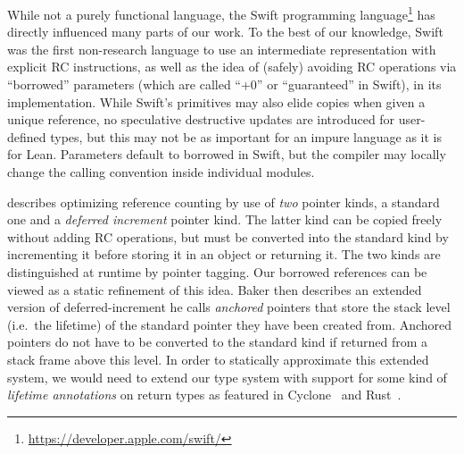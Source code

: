 While not a purely functional language, the Swift programming
language\footnote{\url{https://developer.apple.com/swift/}} has directly
influenced many parts of our work. To the best of our knowledge, Swift was the
first non-research language to use an intermediate representation with explicit RC
instructions, as well as the idea of (safely) avoiding RC operations via ``borrowed''
parameters (which are called ``+0'' or ``guaranteed'' in Swift), in its
implementation. While Swift's primitives may also elide copies when given a
unique reference, no speculative destructive updates are introduced for
user-defined types, but this may not be as important for an impure language as
it is for Lean. Parameters default to borrowed in Swift, but the compiler may
locally change the calling convention inside individual modules.

\citet{Baker:1994:MRC:185009.185016} describes optimizing reference counting by
use of \emph{two} pointer kinds, a standard one and a \emph{deferred increment}
pointer kind. The latter kind can be copied freely without adding RC operations,
but must be converted into the standard kind by incrementing it before storing it in an object or returning it. The two kinds
are distinguished at runtime by pointer tagging. Our borrowed references
can be viewed as a static refinement of this idea. Baker then describes an
extended version of deferred-increment he calls \emph{anchored} pointers that
store the stack level (i.e.\ the lifetime) of the standard pointer they have been
created from. Anchored pointers do not have to be converted to the standard kind if returned
from a stack frame above this level. In order to statically approximate this
extended system, we would need to extend our type system
with support for some kind of \emph{lifetime annotations} on return types
as featured in Cyclone~\cite{jim2002cyclone} and
Rust~\cite{Matsakis:2014:RL:2663171.2663188}.



